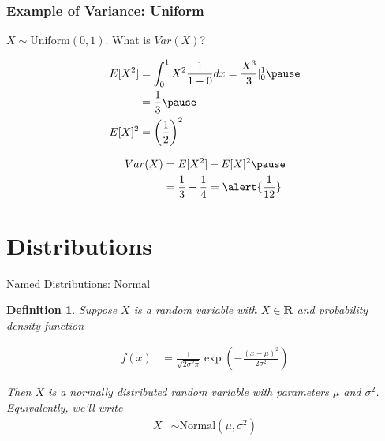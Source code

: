 \documentclass[aspectratio=169, handout]{beamer}
\newtheorem{defn}{Definition}
\numberwithin{equation}{section}
\begin{document}
\begin{frame}
\frametitle{Example of Variance: Uniform} 

$X \sim \text{Uniform}(0,1)$.  What is $Var(X)$? \pause   

\begin{align*} 
E[X^2] & =  \int_0^1 X^2 \frac{1}{1-0}dx=\frac{X^3}{3}|_0^1\pause \\
 & =  \frac{1}{3}  \pause \\
E[X]^2 & =  \left(\frac{1}{2}\right)^2   
\end{align*}

\begin{align*}
Var(X) & = E[X^2] - E[X]^2  \pause  \\
& =  \frac{1}{3} - \frac{1}{4} = \alert{\frac{1}{12}}  
\end{align*}

\end{frame}


\section{Distributions}

\begin{frame}{Named Distributions: Normal}

\begin{defn}
Suppose $X$ is a random variable with $X \in \mathbf{R}$ and probability density function

\begin{align*}
f(x) & =  \frac{1}{\sqrt{2\sigma^2\pi}}\exp\left(-\frac{(x - \mu)^2}{2\sigma^2}\right) 
\end{align*}

Then $X$ is a \alert{normally} distributed random variable with parameters $\mu$ and $\sigma^2$.  \\


Equivalently, we'll write 
\begin{align*}
X & \sim  \text{Normal}(\mu, \sigma^2) 
\end{align*}

\end{defn}
\end{frame}
\end{document}
